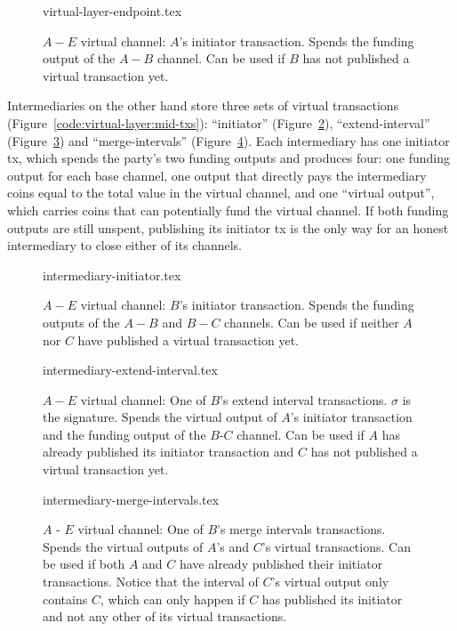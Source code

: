   \begin{figure}
    {virtual-layer-endpoint.tex}
    \caption{$A-E$ virtual channel: $A$'s initiator transaction. Spends the
    funding output of the $A-B$ channel. Can be used if $B$ has not published
    a virtual transaction yet.}
    \label{figure:virtual-layer-endpoint}
  \end{figure}

  Intermediaries on the other hand store three sets of virtual transactions
  (Figure~\ref{code:virtual-layer:mid-txs}): ``initiator''
  (Figure~\ref{figure:virtual-layer-initiator}), ``extend-interval''
  (Figure~\ref{figure:virtual-layer-extend-interval}) and ``merge-intervals''
  (Figure~\ref{figure:virtual-layer-merge-intervals}). Each intermediary has one
  initiator tx, which spends the party's two funding outputs and produces four:
  one funding output for each base channel, one output that directly pays the
  intermediary coins equal to the total value in the virtual channel, and one
  ``virtual output'', which carries coins that can potentially fund the virtual
  channel. If both funding outputs are still unspent, publishing its initiator
  tx is the only way for an honest intermediary to close either of its channels.

  \begin{figure}
    {intermediary-initiator.tex}
    \caption{$A-E$ virtual channel: $B$'s initiator transaction. Spends the
    funding outputs of the $A-B$ and $B-C$ channels. Can be used if neither
    $A$ nor $C$ have published a virtual transaction yet.}
    \label{figure:virtual-layer-initiator}
  \end{figure}

  \begin{figure}
    {intermediary-extend-interval.tex}
    \caption{$A-E$ virtual channel: One of $B$'s extend interval
    transactions. $\sigma$ is the signature. Spends the virtual output of $A$'s
    initiator transaction and the funding output of the $B$-$C$ channel. Can be
    used if $A$ has already published its initiator transaction and $C$ has not
    published a virtual transaction yet.}
    \label{figure:virtual-layer-extend-interval}
  \end{figure}

  \begin{figure}
    {intermediary-merge-intervals.tex}
    \caption{$A$ - $E$ virtual channel: One of $B$'s merge intervals
    transactions. Spends the virtual outputs of $A$'s and $C$'s virtual
    transactions. Can be used if both $A$ and $C$ have already published their
    initiator transactions. Notice that the interval of $C$'s virtual output
    only contains $C$, which can only happen if $C$ has published its initiator
    and not any other of its virtual transactions.}
    \label{figure:virtual-layer-merge-intervals}
  \end{figure}

